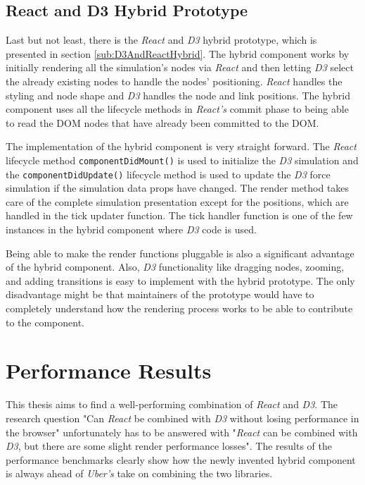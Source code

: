 \subsection{React and D3 Hybrid Prototype}

Last but not least, there is the \emph{React} and \emph{D3} hybrid prototype, which is presented in section \ref{sub:D3AndReactHybrid}. The hybrid component works by initially rendering all the simulation's nodes via \emph{React} and then letting \emph{D3} select the already existing nodes to handle the nodes' positioning. \emph{React} handles the styling and node shape and \emph{D3} handles the node and link positions. The hybrid component uses all the lifecycle methods in \emph{React's} commit phase to being able to read the DOM nodes that have already been committed to the DOM. 

The implementation of the hybrid component is very straight forward. The \emph{React} lifecycle method \texttt{componentDidMount()} is used to initialize the \emph{D3} simulation and the \texttt{componentDidUpdate()} lifecycle method is used to update the \emph{D3} force simulation if the simulation data props have changed. The render method takes care of the complete simulation presentation except for the positions, which are handled in the tick updater function. The tick handler function is one of the few instances in the hybrid component where \emph{D3} code is used.

Being able to make the render functions pluggable is also a sig\-nifi\-cant advantage of the hybrid component. Also, \emph{D3} functionality like dragging nodes, zooming, and adding transitions is easy to implement with the hybrid prototype. The only disadvantage might be that maintainers of the prototype would have to completely understand how the rendering process works to be able to contribute to the component.

\section{Performance Results}

This thesis aims to find a well-performing combination of \emph{React} and \emph{D3}. The research question "Can \emph{React} be combined with \emph{D3} without losing performance in the browser" unfortunately has to be answered with "\emph{React} can be combined with \emph{D3}, but there are some slight render performance losses". The results of the performance benchmarks clearly show how the newly invented hybrid component is always ahead of \emph{Uber's} take on combining the two libraries. 

